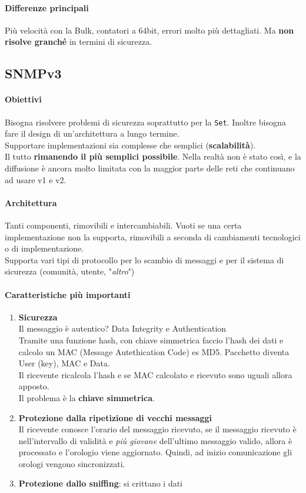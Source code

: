 \documentclass[10pt]{book}
\begin{document}
\paragraph{Differenze principali} Più velocità con la Bulk, contatori a 64bit, errori molto più dettagliati. Ma \textbf{non risolve granché} in termini di sicurezza.
\subsection{SNMPv3}
\paragraph{Obiettivi} Bisogna risolvere problemi di sicurezza soprattutto per la \texttt{Set}. Inoltre bisogna fare il design di un'architettura a lungo termine.\\
Supportare implementazioni sia complesse che semplici (\textbf{scalabilità}).\\
Il tutto \textbf{rimanendo il più semplici possibile}. Nella realtà non è stato così, e la diffusione è ancora molto limitata con la maggior parte delle reti che continuano ad usare v1 e v2.
\paragraph{Architettura} Tanti componenti, rimovibili e intercambiabili. Vuoti se una certa implementazione non la supporta, rimovibili a seconda di cambiamenti tecnologici o di implementazione.\\
Supporta vari tipi di protocollo per lo scambio di messaggi e per il sistema di sicurezza (comunità, utente, "\textit{altro}")
\paragraph{Caratteristiche più importanti} 
\begin{enumerate}
	\item \textbf{Sicurezza}\\
	Il messaggio è autentico? Data Integrity e Authentication\\
	Tramite una funzione hash, con chiave simmetrica faccio l'hash dei dati e calcolo un MAC (Message Autethication Code) es MD5. Pacchetto diventa User (key), MAC e Data.\\
	Il ricevente ricalcola l'hash e se MAC calcolato e ricevuto sono uguali allora apposto.\\
	Il problema è la \textbf{chiave simmetrica}.
	\item \textbf{Protezione dalla ripetizione di vecchi messaggi}\\
	Il ricevente conosce l'orario del messaggio ricevuto, se il messaggio ricevuto è nell'intervallo di validità e \textit{più giovane} dell'ultimo messaggio valido, allora è processato e l'orologio viene aggiornato. Quindi, ad inizio comunicazione gli orologi vengono sincronizzati.
	\item \textbf{Protezione dallo sniffing}: si crittano i dati
\end{enumerate}
\end{document}
